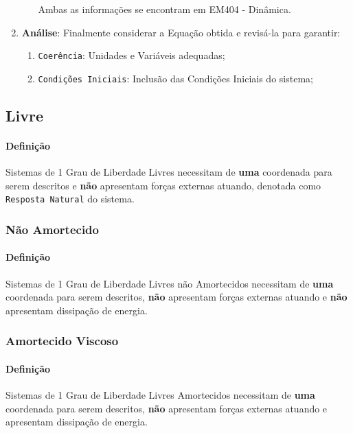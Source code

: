 \documentclass{article}
\begin{document}
\begin{enumerate}[rightmargin = \leftmargin]
\begin{enumerate}[rightmargin = \leftmargin, noitemsep]
            Ambas as informações se encontram em EM404 - Dinâmica.
        \end{enumerate}

        \item \textbf{Análise}: Finalmente considerar a Equação obtida e revisá-la para garantir:
        \begin{enumerate}[rightmargin = \leftmargin, noitemsep]
            \item \texttt{Coerência}: Unidades e Variáveis adequadas;
            \item \texttt{Condições Iniciais}: Inclusão das Condições Iniciais do sistema;
        \end{enumerate}
    \end{enumerate}




\newpage\subsection{Livre}
    \paragraph{Definição}Sistemas de 1 Grau de Liberdade Livres necessitam de \textbf{uma} coordenada para serem descritos e \textbf{não} apresentam forças externas atuando, denotada como \texttt{Resposta Natural} do sistema.

\subsubsection{Não Amortecido}
    \paragraph{Definição}Sistemas de 1 Grau de Liberdade Livres não Amortecidos necessitam de \textbf{uma} coordenada para serem descritos, \textbf{não} apresentam forças externas atuando e \textbf{não} apresentam dissipação de energia.

\subsubsection{Amortecido Viscoso}
    \paragraph{Definição}Sistemas de 1 Grau de Liberdade Livres Amortecidos necessitam de \textbf{uma} coordenada para serem descritos, \textbf{não} apresentam forças externas atuando e apresentam dissipação de energia.
\end{document}
